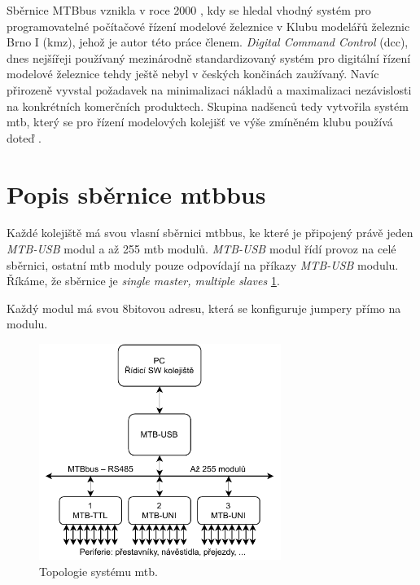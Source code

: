 Sběrnice MTBbus vznikla v roce 2000 \cite{mtb:web}, kdy se hledal vhodný systém
pro programovatelné počítačové řízení modelové železnice v Klubu modelářů
železnic Brno I (\gls{kmz}), jehož je autor této práce členem.
\textit{Digital Command Control} (\gls{dcc}), dnes nejšířeji používaný
mezinárodně standardizovaný systém pro digitální řízení modelové železnice
\cite{dcc_intro:web} tehdy ještě nebyl v českých končinách zaužívaný. Navíc
přirozeně vyvstal požadavek na minimalizaci nákladů a maximalizaci nezávislosti
na konkrétních komerčních produktech. Skupina nadšenců tedy vytvořila systém
\gls{mtb}, který se pro řízení modelových kolejišť ve výše zmíněném klubu
používá doteď \cite{kmz_rizeni:web}.

\section{Popis sběrnice \gls{mtbbus}} \label{sec:mtbbus}

Každé kolejiště má svou vlasní sběrnici \gls{mtbbus}, ke které je připojený
právě jeden \textit{MTB-USB} modul a až 255 \gls{mtb} modulů. \textit{MTB-USB}
modul řídí provoz na celé sběrnici, ostatní \gls{mtb} moduly pouze odpovídají
na příkazy \textit{MTB-USB} modulu. Říkáme, že sběrnice je \textit{single
master, multiple slaves} \ref{fig:mtbbus-topology}.

Každý modul má svou 8bitovou adresu, která se konfiguruje jumpery přímo na
modulu.

\begin{figure}[ht]
\includegraphics[width=0.7\textwidth]{data/mtb-topology.pdf}
\caption{Topologie systému \gls{mtb}.}
\label{fig:mtbbus-topology}
\end{figure}

